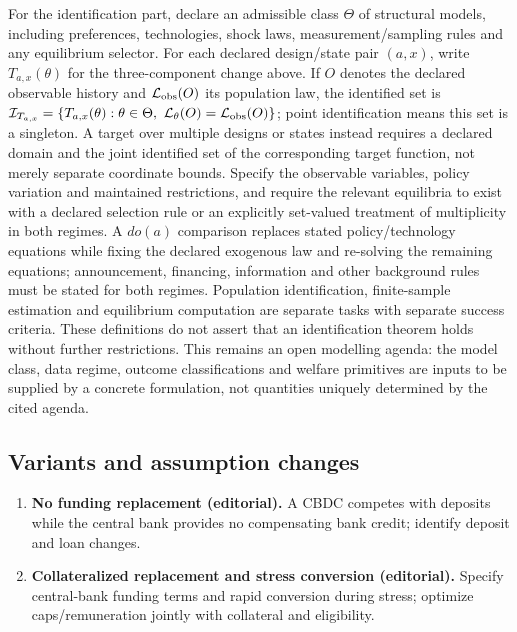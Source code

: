 \documentclass[11pt,a4paper]{article}
\begin{document}
For the identification part, declare an admissible class \(\Theta\) of structural models, including preferences, technologies, shock laws, measurement/sampling rules and any equilibrium selector. For each declared design/state pair \((a,x)\), write \(T_{a,x}(\theta)\) for the three-component change above. If \(O\) denotes the declared observable history and \(\mathcal L_{\rm obs}(O)\) its population law, the identified set is \(\mathcal I_{T_{a,x}}=\{T_{a,x}(\theta):\theta\in\Theta,\ \mathcal L_\theta(O)=\mathcal L_{\rm obs}(O)\}\); point identification means this set is a singleton. A target over multiple designs or states instead requires a declared domain and the joint identified set of the corresponding target function, not merely separate coordinate bounds. Specify the observable variables, policy variation and maintained restrictions, and require the relevant equilibria to exist with a declared selection rule or an explicitly set-valued treatment of multiplicity in both regimes. A \(do(a)\) comparison replaces stated policy/technology equations while fixing the declared exogenous law and re-solving the remaining equations; announcement, financing, information and other background rules must be stated for both regimes. Population identification, finite-sample estimation and equilibrium computation are separate tasks with separate success criteria. These definitions do not assert that an identification theorem holds without further restrictions. This remains an open modelling agenda: the model class, data regime, outcome classifications and welfare primitives are inputs to be supplied by a concrete formulation, not quantities uniquely determined by the cited agenda.
\subsection*{Variants and assumption changes}
\begin{enumerate}
\item \textbf{No funding replacement (editorial).} A CBDC competes with deposits while the central bank provides no compensating bank credit; identify deposit and loan changes.
\item \textbf{Collateralized replacement and stress conversion (editorial).} Specify central-bank funding terms and rapid conversion during stress; optimize caps/remuneration jointly with collateral and eligibility.
\end{enumerate}
\end{document}

